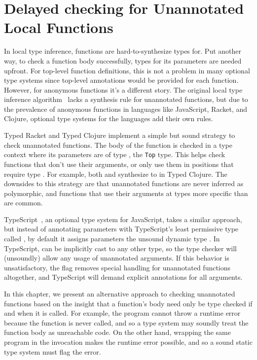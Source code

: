 \chapter{Delayed checking for Unannotated Local Functions}
\label{chapter:symbolic:symbolic-closures}

In local type inference, functions are hard-to-synthesize types for.
Put another way, to check a function body successfully, types for
its parameters are needed upfront.
For top-level function definitions, this is not a problem in many
optional type systems since top-level annotations would be provided
for each function.
However, for anonymous functions it's a different story.
The original local type inference algorithm~\cite{PierceLTI}
lacks a synthesis rule for unannotated functions, but due to the prevalence
of anonymous functions in languages like JavaScript, Racket, and Clojure,
optional type systems for the languages add their own rules.

Typed Racket and Typed Clojure implement a simple but sound strategy
to check unannotated functions. The body of the function is checked
in a type context where its parameters are of type ,
the \texttt{Top} type.
This helps check functions that don't use their arguments, or only
use them in positions that require type .
For example, both  and  
synthesize to  in Typed Clojure.
The downsides to this strategy are that unannotated functions are never
inferred as polymorphic, and functions that use their arguments
at types more specific than  are common.

TypeScript~\cite{typescript}, an optional type system for JavaScript,
takes a similar approach, but instead of annotating parameters with
TypeScript's least permissive type called ,
by default it assigns parameters the unsound dynamic type .
In TypeScript,  can be implicitly cast to any other type,
so the type checker will (unsoundly) allow any usage of unannotated arguments.
If this behavior is unsatisfactory,
the  flag removes special handling for unannotated
functions altogether, and TypeScript will demand explicit annotations for all arguments.

In this chapter, we present an alternative approach to checking unannotated functions
based on the insight that a function's body need only be type checked if and when it is called.
For example, the program  cannot throw a runtime error because
the function is never called, and so a type system may soundly treat the function body as unreachable code.
On the other hand, wrapping the same program in the invocation
makes the runtime error possible, and so a sound static type system must flag the error.

